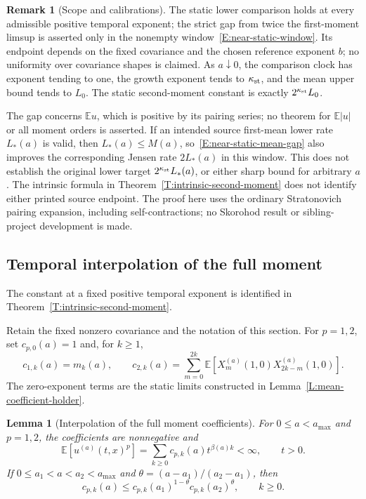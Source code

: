 \documentclass[12pt,oneside,openany]{book}
\numberwithin{equation}{section}
\newtheorem{lemma}[theorem]{Lemma}
\theoremstyle{nogostyle}
\theoremstyle{definition}
\newtheorem{remark}[theorem]{Remark}
\newcommand{\E}{\mathbb{E}}
\begin{document}
\begin{remark}[Scope and calibrations]\label{R:near-static-scope}
  The static lower comparison holds at every admissible positive temporal
  exponent; the strict gap from twice the first-moment limsup is asserted only
  in the nonempty window~\eqref{E:near-static-window}. Its endpoint depends on
  the fixed covariance and the chosen reference exponent $b$; no uniformity over
  covariance shapes is claimed. As $a\downarrow0$, the comparison clock has
  exponent tending to one, the growth exponent tends to $\kappa_{\rm st}$, and
  the mean upper bound tends to $L_0$. The static second-moment constant is
  exactly $2^{\kappa_{\rm st}}L_0$.

  The gap concerns $\E u$, which is positive by its pairing series; no theorem
  for $\E|u|$ or all moment orders is asserted. If an intended source first-mean
  lower rate $L_*(a)$ is valid, then $L_*(a) \le M(a)$,
  so~\eqref{E:near-static-mean-gap} also improves the corresponding Jensen rate
  $2L_*(a)$ in this window. This does not establish the original lower target
  $2^{\kappa_{\rm st}}L_*(a)$, or either sharp bound for arbitrary $a$. The
  intrinsic formula in Theorem~\ref{T:intrinsic-second-moment} does not
  identify either printed source endpoint. The proof here uses the ordinary
  Stratonovich pairing expansion, including self-contractions; no Skorohod
  result or sibling-project development is made.
\end{remark}


\subsection{Temporal interpolation of the full moment}
\label{S:temporal-type-continuity}

The constant at a fixed positive temporal exponent is identified  in
Theorem~\ref{T:intrinsic-second-moment}.

Retain the fixed nonzero covariance and the notation of this section. For
\(p=1,2\), set \(c_{p,0}(a)=1\) and, for \(k\ge1\),
\begin{equation}\label{E:full-moment-coefficients}
  c_{1,k}(a)=m_k(a),\qquad
  c_{2,k}(a)=\sum_{m=0}^{2k}
  \E[X_m^{(a)}(1,0)X_{2k-m}^{(a)}(1,0)].
\end{equation}
The zero-exponent terms are the static limits constructed in
Lemma~\ref{L:mean-coefficient-holder}.

\begin{lemma}[Interpolation of the full moment coefficients]
  \label{L:full-moment-coefficient-holder}
  For \(0\le a<a_{\max}\) and \(p=1,2\), the coefficients are nonnegative and
  \begin{equation}\label{E:full-moment-positive-series}
    \E[u^{(a)}(t,x)^p]
    =\sum_{k\ge0}c_{p,k}(a)t^{\beta(a)k}<\infty,\qquad t>0.
  \end{equation}
  If \(0\le a_1<a<a_2<a_{\max}\) and \(\theta=(a-a_1)/(a_2-a_1)\), then
  \begin{equation}\label{E:full-moment-coefficient-holder}
    c_{p,k}(a)\le
    c_{p,k}(a_1)^{1-\theta}c_{p,k}(a_2)^\theta,\qquad k\ge0.
  \end{equation}
\end{lemma}
\end{document}
